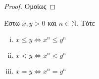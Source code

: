 \documentclass[main.tex]{subfiles}
\begin{document}

\begin{proof}
  Ομοίως
\end{proof}

\begin{lem}\label{lem:ineqs}
  Έστω $ x,y >0 $ και $ n \in \mathbb{N} $. Τότε
  \begin{enumerate}[(i)]
    \item $ x \leq y \Leftrightarrow x^{n} \leq y^{n} $
    \item $ x < y \Leftrightarrow x^{n} < y^{n} $ \label{lem:ineqreal2}
    \item $ x = y \Leftrightarrow x^{n} = y^{n} $ \label{lem:ineqreal3}
  \end{enumerate}
\end{lem}

\end{document}
